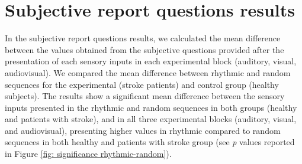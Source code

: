 \section{Subjective report questions results}
In the subjective report questions results, we calculated the mean difference between the values obtained from the subjective questions provided after the presentation of each sensory inputs in each experimental block (auditory, visual, audiovisual). We compared the mean difference between rhythmic and random sequences for the experimental (stroke patients) and control group (healthy subjects). 
The results show a significant mean difference between the sensory inputs presented in the rhythmic and random sequences in both groups (healthy and patients with stroke), and in all three experimental blocks (auditory, visual, and audiovisual), presenting higher values in rhythmic compared to random sequences in both healthy and patients with stroke group (see \textit{p} values reported in Figure \ref{fig: significance rhythmic-random}).
